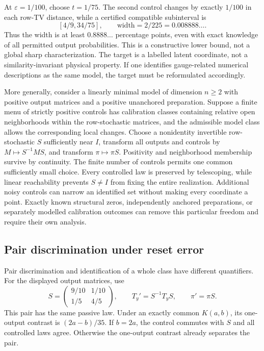 \documentclass[11pt,letterpaper]{article}
\begin{document}
At $\varepsilon=1/100$, choose $t=1/75$. The second control changes by exactly $1/100$ in each row-TV distance, while a certified compatible subinterval is
\[
 [4/9,34/75],\qquad\text{width}=2/225=0.008888\ldots .
\]
Thus the width is at least $0.8888\ldots$ percentage points, even with exact knowledge of all permitted output probabilities. This is a constructive lower bound, not a global sharp characterization. The target is a labelled latent coordinate, not a similarity-invariant physical property. If one identifies gauge-related numerical descriptions as the same model, the target must be reformulated accordingly.

More generally, consider a linearly minimal model of dimension \(n\ge2\)
with positive output matrices and a positive unanchored preparation. Suppose a
finite menu of strictly positive controls has calibration classes containing
relative open neighborhoods within the row-stochastic matrices, and the
admissible model class allows the corresponding local changes. Choose a
nonidentity invertible row-stochastic \(S\) sufficiently near \(I\), transform
all outputs and controls by \(M\mapsto S^{-1}MS\), and transform
\(\pi\mapsto\pi S\). Positivity and neighborhood membership survive by
continuity. The finite number of controls permits one common sufficiently small
choice. Every controlled law is preserved by telescoping, while linear
reachability prevents \(S\ne I\) from fixing the entire realization. Additional noisy controls can narrow an identified set without making every coordinate a point. Exactly known structural zeros, independently anchored preparations, or separately modelled calibration outcomes can remove this particular freedom and require their own analysis.


\subsection{Pair discrimination under reset error}

Pair discrimination and identification of a whole class have different
quantifiers. For the displayed output matrices, use
\[
 S=\begin{pmatrix}9/10&1/10\\1/5&4/5\end{pmatrix},\qquad
 T_y'=S^{-1}T_yS,\qquad\pi'=\pi S.
\]
This pair has the same passive law. Under an exactly common \(K(a,b)\), its
one-output contrast is \((2a-b)/35\). If \(b=2a\), the control commutes with
\(S\) and all controlled laws agree. Otherwise the one-output contrast
already separates the pair.
\end{document}
